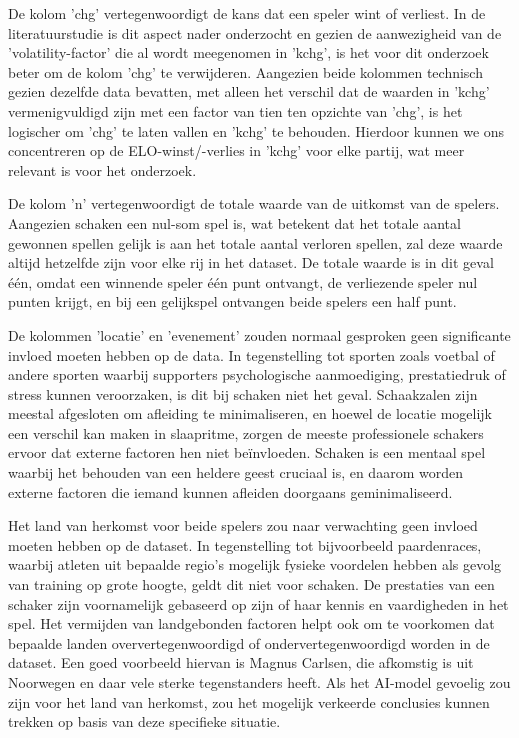De kolom 'chg' vertegenwoordigt de kans dat een speler wint of verliest. In de literatuurstudie is dit aspect nader onderzocht en gezien de aanwezigheid van de 'volatility-factor' die al wordt meegenomen in 'kchg', is het voor dit onderzoek beter om de kolom 'chg' te verwijderen. Aangezien beide kolommen technisch gezien dezelfde data bevatten, met alleen het verschil dat de waarden in 'kchg' vermenigvuldigd zijn met een factor van tien ten opzichte van 'chg', is het logischer om 'chg' te laten vallen en 'kchg' te behouden. Hierdoor kunnen we ons concentreren op de ELO-winst/-verlies in 'kchg' voor elke partij, wat meer relevant is voor het onderzoek.

De kolom 'n' vertegenwoordigt de totale waarde van de uitkomst van de spelers. Aangezien schaken een nul-som spel is, wat betekent dat het totale aantal gewonnen spellen gelijk is aan het totale aantal verloren spellen, zal deze waarde altijd hetzelfde zijn voor elke rij in het dataset. De totale waarde is in dit geval één, omdat een winnende speler één punt ontvangt, de verliezende speler nul punten krijgt, en bij een gelijkspel ontvangen beide spelers een half punt.

De kolommen 'locatie' en 'evenement' zouden normaal gesproken geen significante invloed moeten hebben op de data. In tegenstelling tot sporten zoals voetbal of andere sporten waarbij supporters psychologische aanmoediging, prestatiedruk of stress kunnen veroorzaken, is dit bij schaken niet het geval. Schaakzalen zijn meestal afgesloten om afleiding te minimaliseren, en hoewel de locatie mogelijk een verschil kan maken in slaapritme, zorgen de meeste professionele schakers ervoor dat externe factoren hen niet beïnvloeden. Schaken is een mentaal spel waarbij het behouden van een heldere geest cruciaal is, en daarom worden externe factoren die iemand kunnen afleiden doorgaans geminimaliseerd.

Het land van herkomst voor beide spelers zou naar verwachting geen invloed moeten hebben op de dataset. In tegenstelling tot bijvoorbeeld paardenraces, waarbij atleten uit bepaalde regio's mogelijk fysieke voordelen hebben als gevolg van training op grote hoogte, geldt dit niet voor schaken. De prestaties van een schaker zijn voornamelijk gebaseerd op zijn of haar kennis en vaardigheden in het spel. Het vermijden van landgebonden factoren helpt ook om te voorkomen dat bepaalde landen oververtegenwoordigd of ondervertegenwoordigd worden in de dataset. Een goed voorbeeld hiervan is Magnus Carlsen, die afkomstig is uit Noorwegen en daar vele sterke tegenstanders heeft. Als het AI-model gevoelig zou zijn voor het land van herkomst, zou het mogelijk verkeerde conclusies kunnen trekken op basis van deze specifieke situatie.

